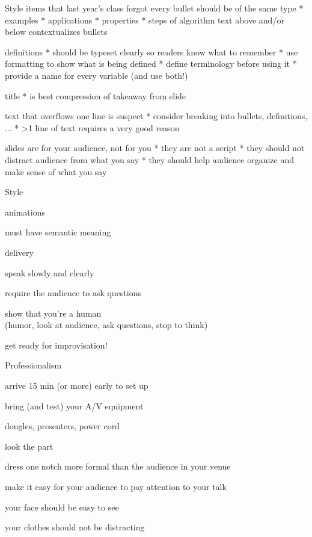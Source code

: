 \documentclass[presentation,xcolor={usenames,dvipsnames}]{beamer}
\begin{document}
\begin{frame}{Style items that last year's class forgot}
every bullet should be of the same type
* examples
* applications
* properties
* steps of algorithm
text above and/or below contextualizes bullets

definitions
* should be typeset clearly so readers know what to remember
* use formatting to show what is being defined
* define terminology before using it
* provide a name for every variable (and use both!)


title
* is best compression of takeaway from slide

text that overflows one line is suspect
* consider breaking into bullets, definitions, ...
* >1 line of text requires a very good reason

slides are for your audience, not for you
* they are not a script
* they should not distract audience from what you say
* they should help audience organize and make sense of what you say
\end{frame}

\begin{frame}{Style}

animations
\bit
\item must have semantic meaning
\eit

delivery
\bit
\item speak slowly and clearly
\item require the audience to ask questions
\item show that you're a human \\
(humor, look at audience, ask questions, stop to think)
\item get ready for improvisation!
\eit

\end{frame}

\begin{frame}{Professionalism}

  \bit
  \item arrive 15 min (or more) early to set up
  \item bring (and test) your A/V equipment
  \bit \item dongles, presenters, power cord \etc \eit
  \item look the part
  \bit
  \item dress one notch more formal than the audience in your venue
  \item make it easy for your audience to pay attention to your talk
  \bit
  \item your face should be easy to see
  \item your clothes should not be distracting
  \eit
  \eit
  \eit

\end{frame}
\end{document}
